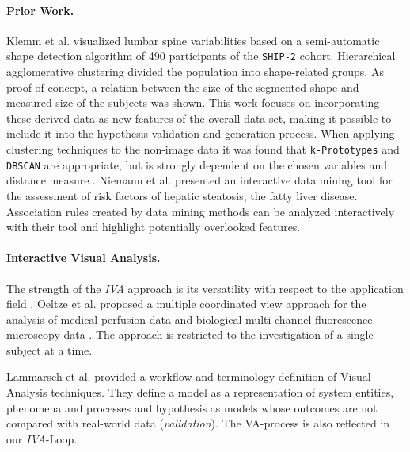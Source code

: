 \documentclass[journal]{style/vgtc} 			          %
\newcommand{\add}[1]{\textcolor{blue}{\uline{#1}}}
\begin{document}
\paragraph{Prior Work.}
Klemm et al. \cite{Klemm2013VMV} visualized lumbar spine variabilities based on a semi-automatic shape detection algorithm of 490 participants of the \texttt{SHIP-2} cohort.
%
Hierarchical agglomerative clustering divided the population into shape-related groups.
%
As proof of concept, a relation between the size of the segmented shape and measured size of the subjects was shown.
%
This work focuses on incorporating these derived data as new features of the overall data set, making it possible to include it into the hypothesis validation and generation process.
%
When applying clustering techniques to the non-image data it was found that \texttt{k-Prototypes} and \texttt{DBSCAN} are appropriate, but is strongly dependent on the chosen variables and distance measure \cite{Klemm2014BVM}.
%
Niemann et al. \cite{Niemann2014} presented an interactive data mining tool for the assessment of risk factors of hepatic steatosis, the fatty liver disease.
%
Association rules created by data mining methods can be analyzed interactively with their tool and highlight potentially overlooked features.
%

\paragraph{Interactive Visual Analysis.}
The strength of the \emph{IVA} approach is its versatility with respect to the application field \cite{Konyha2009}.
%
Oeltze et al. proposed a multiple coordinated view approach for the analysis of medical perfusion data \cite{Oeltze2007} and biological multi-channel fluorescence microscopy data \cite{Oeltze2011}.
%
The approach is restricted to the investigation of a single subject at a time.
%

Lammarsch et al. \cite{Lammarsch2011} provided a workflow and terminology definition of Visual Analysis techniques.
%
They define a model as a representation of system entities, phenomena and processes and hypothesis as models whose outcomes are not compared with real-world data (\emph{validation}).
%
The VA-process is also reflected in our \emph{IVA}-Loop.
\end{document}
